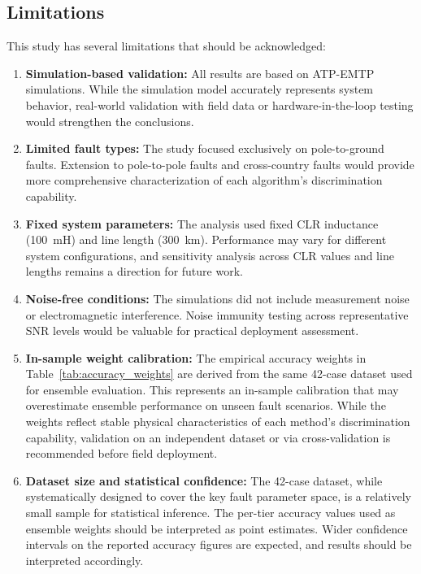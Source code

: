\documentclass[journal]{IEEEtran}
\begin{document}
\subsection{Limitations}

This study has several limitations that should be acknowledged:

\begin{enumerate}
    \item \textbf{Simulation-based validation:} All results are based
    on ATP-EMTP simulations. While the simulation model accurately
    represents system behavior, real-world validation with field data
    or hardware-in-the-loop testing would strengthen the conclusions.

    \item \textbf{Limited fault types:} The study focused exclusively
    on pole-to-ground faults. Extension to pole-to-pole faults and
    cross-country faults would provide more comprehensive
    characterization of each algorithm's discrimination capability.

    \item \textbf{Fixed system parameters:} The analysis used fixed
    CLR inductance (100~mH) and line length (300~km). Performance may
    vary for different system configurations, and sensitivity analysis
    across CLR values and line lengths remains a direction for future
    work.

    \item \textbf{Noise-free conditions:} The simulations did not
    include measurement noise or electromagnetic interference. Noise
    immunity testing across representative SNR levels would be
    valuable for practical deployment assessment.

    \item \textbf{In-sample weight calibration:} The empirical
    accuracy weights in Table~\ref{tab:accuracy_weights} are derived
    from the same 42-case dataset used for ensemble evaluation.
    This represents an in-sample calibration that may overestimate
    ensemble performance on unseen fault scenarios. While the weights
    reflect stable physical characteristics of each method's
    discrimination capability, validation on an independent dataset
    or via cross-validation is recommended before field deployment.

    \item \textbf{Dataset size and statistical confidence:} The
    42-case dataset, while systematically designed to cover the key
    fault parameter space, is a relatively small sample for
    statistical inference. The per-tier accuracy values used as
    ensemble weights should be interpreted as point estimates.
    Wider confidence intervals on the reported accuracy figures
    are expected, and results should be interpreted accordingly.
\end{enumerate}
\end{document}

